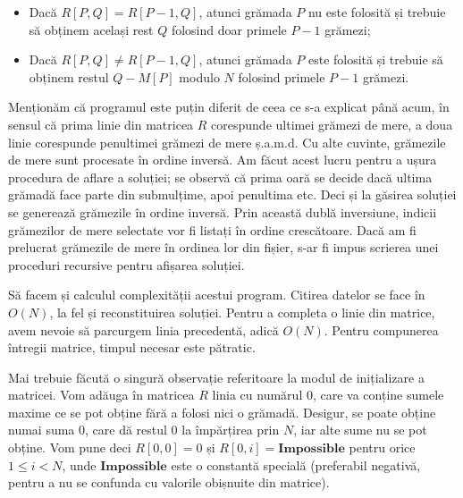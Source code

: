 \begin{itemize}

\item Dacă $R[P,Q] = R[P-1,Q]$, atunci grămada $P$ nu este folosită și trebuie
  să obținem același rest $Q$ folosind doar primele $P-1$ grămezi;

\item Dacă $R[P,Q] \neq R[P-1,Q]$, atunci grămada $P$ este folosită și trebuie
  să obținem restul $Q- M[P]$ modulo $N$ folosind primele $P-1$ grămezi.

\end{itemize}

Menționăm că programul este puțin diferit de ceea ce s-a explicat până acum,
în sensul că prima linie din matricea $R$ corespunde ultimei grămezi de mere,
a doua linie corespunde penultimei grămezi de mere ș.a.m.d. Cu alte cuvinte,
grămezile de mere sunt procesate în ordine inversă. Am făcut acest lucru
pentru a ușura procedura de aflare a soluției; se observă că prima oară se
decide dacă ultima grămadă face parte din submulțime, apoi penultima etc. Deci
și la găsirea soluției se generează grămezile în ordine inversă. Prin această
dublă inversiune, indicii grămezilor de mere selectate vor fi listați în
ordine crescătoare. Dacă am fi prelucrat grămezile de mere în ordinea lor din
fișier, s-ar fi impus scrierea unei proceduri recursive pentru afișarea
soluției.

Să facem și calculul complexității acestui program. Citirea datelor se face în
$O(N)$, la fel și reconstituirea soluției. Pentru a completa o linie din
matrice, avem nevoie să parcurgem linia precedentă, adică $O(N)$. Pentru
compunerea întregii matrice, timpul necesar este pătratic.

Mai trebuie făcută o singură observație referitoare la modul de inițializare a
matricei. Vom adăuga în matricea $R$ linia cu numărul 0, care va conține
sumele maxime ce se pot obține fără a folosi nici o grămadă. Desigur, se poate
obține numai suma 0, care dă restul 0 la împărțirea prin $N$, iar alte sume nu
se pot obține. Vom pune deci $R[0,0]=0$ și $R[0,i]=\mathbf{Impossible}$ pentru
orice $1 \leq i < N$, unde $\mathbf{Impossible}$ este o constantă specială
(preferabil negativă, pentru a nu se confunda cu valorile obișnuite din
matrice).

\inputminted{c}{src/problem14.c}
